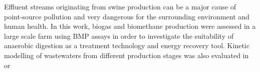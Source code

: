Effluent streams originating from swine production can be a major cause of point-source pollution and very dangerous for the surrounding environment and human health. In this work, biogas and biomethane production were assessed in a large scale farm using BMP assays in order to investigate the suitability of anaerobic digestion as a treatment technology and energy recovery tool. Kinetic modelling of wastewaters from different production stages was also evaluated in or